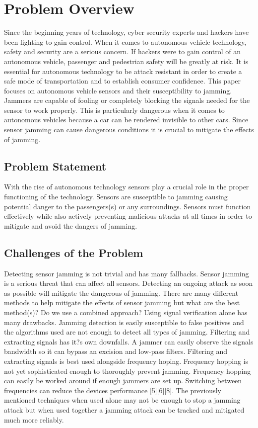 \documentclass[conference]{IEEEtran}
\begin{document}
\section{Problem Overview} Since the beginning years of technology, cyber security experts and hackers have been fighting to gain control. When it comes to autonomous vehicle technology, safety and security are a serious concern. If hackers were to gain control of an autonomous vehicle, passenger and pedestrian safety will be greatly at risk. It is essential for autonomous technology to be attack resistant in order to create a safe mode of transportation and to establish consumer confidence. This paper focuses on autonomous vehicle sensors and their susceptibility to jamming. Jammers are capable of fooling or completely blocking the signals needed for the sensor to work properly. This is particularly dangerous when it comes to autonomous vehicles because a car can be rendered invisible to other cars. Since sensor jamming can cause dangerous conditions it is crucial to mitigate the effects of jamming.\\

\subsection{Problem Statement}
With the rise of autonomous technology sensors play a crucial role in the proper functioning of the technology. Sensors are susceptible to jamming causing potential danger to the passengers(s) or any surroundings. Sensors must function effectively while also actively preventing malicious attacks at all times in order to mitigate and avoid the dangers of jamming.\\
\subsection{Challenges of the Problem}
Detecting sensor jamming is not trivial and has many fallbacks.  Sensor jamming is a serious threat that can affect all sensors. Detecting an ongoing attack as soon as possible will mitigate the dangerous of jamming.  There are many different methods to help mitigate the effects of sensor jamming but what are the best method(s)?  Do we use a combined approach? Using signal verification alone has many drawbacks.  Jamming detection is easily susceptible to false positives and the algorithms used are not enough to detect all types of jamming\cite{6}\cite{7}.  Filtering and extracting signals has it?s own downfalls. A jammer can easily observe the signals bandwidth so it can bypass an excision and low-pass filters. Filtering and extracting signals is best used alongside frequency hoping\cite{4}\cite{5}. Frequency hopping is not yet sophisticated enough to thoroughly prevent jamming. Frequency hopping can easily be worked around if enough jammers are set up. Switching between frequencies can reduce the devices performance [5][6][8]. The previously mentioned techniques when used alone may not be enough to stop a jamming attack but when used together a jamming attack can be tracked and mitigated much more reliably. \\
\end{document}
